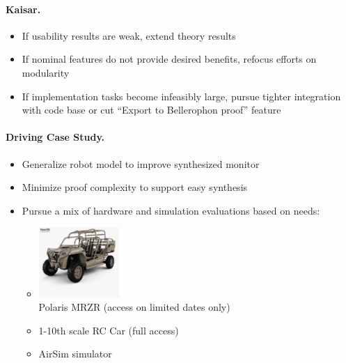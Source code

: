 \documentclass[12pt]{cmuthesis}
\theoremstyle{definition}
\theoremstyle{remark}
\begin{document}
\paragraph*{Kaisar.}
\begin{itemize}
\item If usability results are weak, extend theory results
\item If nominal features do not provide desired benefits, refocus efforts on modularity
\item If implementation tasks become infeasibly large, pursue tighter integration with \KeYmaeraX code base or cut ``Export to Bellerophon proof'' feature
\end{itemize}


\paragraph*{Driving Case Study.}
\begin{itemize}
\item Generalize robot model to improve synthesized monitor
\item Minimize proof complexity to support easy synthesis
\item Pursue a mix of hardware and simulation evaluations based on needs:
\begin{itemize}
\item\includegraphics[width=1.2in]{img/mrzr.jpg}\\
Polaris MRZR (access on limited dates only)
\item 1-10th scale RC Car (full access)
\item AirSim simulator
\end{itemize}
\end{itemize}


\appendix

\backmatter


\end{document}
